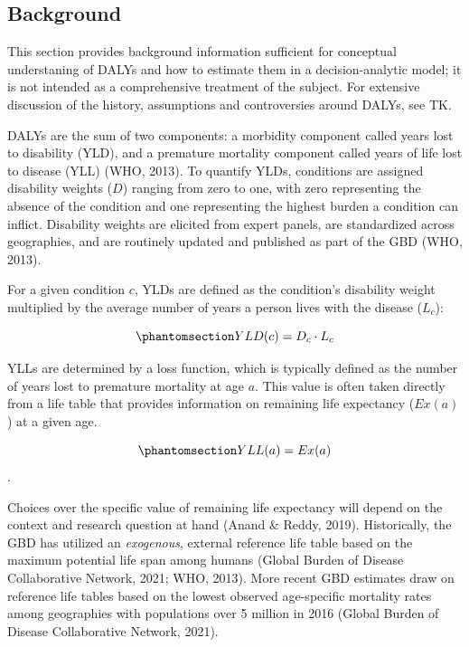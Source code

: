 \documentclass[
]{agujournal2019}
\begin{document}
\subsection{Background}\label{sec-background}

This section provides background information sufficient for conceptual
understaning of DALYs and how to estimate them in a decision-analytic
model; it is not intended as a comprehensive treatment of the subject.
For extensive discussion of the history, assumptions and controversies
around DALYs, see TK.

DALYs are the sum of two components: a morbidity component called years
lost to disability (YLD), and a premature mortality component called
years of life lost to disease (YLL) (WHO, 2013). To quantify YLDs,
conditions are assigned disability weights (\(D\)) ranging from zero to
one, with zero representing the absence of the condition and one
representing the highest burden a condition can inflict. Disability
weights are elicited from expert panels, are standardized across
geographies, and are routinely updated and published as part of the GBD
(WHO, 2013).

For a given condition \(c\), YLDs are defined as the condition's
disability weight multiplied by the average number of years a person
lives with the disease (\(L_c\)):

\begin{equation}\phantomsection\label{eq-yld1}{
YLD(c) = D_c \cdot L_c
}\end{equation}

YLLs are determined by a loss function, which is typically defined as
the number of years lost to premature mortality at age \(a\). This value
is often taken directly from a life table that provides information on
remaining life expectancy (\(Ex(a)\)) at a given age.

\begin{equation}\phantomsection\label{eq-yll1}{
YLL(a)= Ex(a)
}\end{equation} .

Choices over the specific value of remaining life expectancy will depend
on the context and research question at hand (Anand \& Reddy, 2019).
Historically, the GBD has utilized an \emph{exogenous}, external
reference life table based on the maximum potential life span among
humans (Global Burden of Disease Collaborative Network, 2021; WHO,
2013). More recent GBD estimates draw on reference life tables based on
the lowest observed age-specific mortality rates among geographies with
populations over 5 million in 2016 (Global Burden of Disease
Collaborative Network, 2021).
\end{document}
